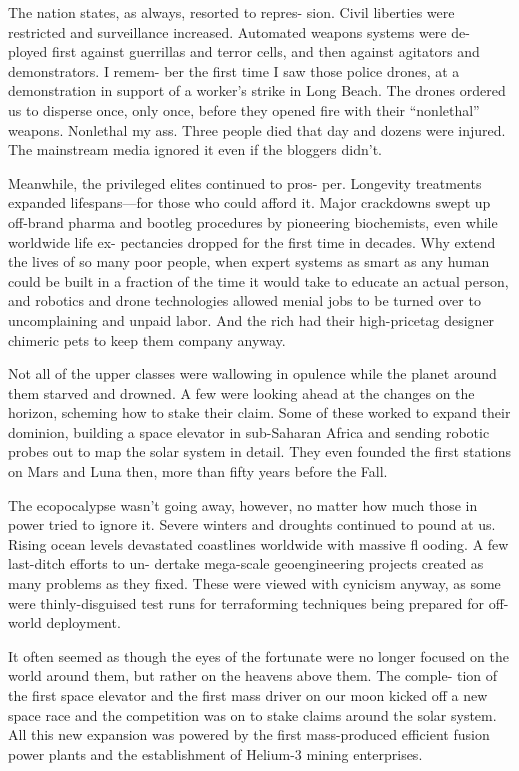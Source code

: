 The nation states, as always, resorted to repres-
sion. Civil liberties were restricted and surveillance 
increased. Automated weapons systems were de-
ployed first against guerrillas and terror cells, and 
then against agitators and demonstrators. I remem-
ber the first time I saw those police drones, at a 
demonstration in support of a worker's strike in Long 
Beach. The drones ordered us to disperse once, only 
once, before they opened fire with their ``nonlethal'' 
weapons. Nonlethal my ass. Three people died that 
day and dozens were injured. The mainstream media 
ignored it even if the bloggers didn't.

Meanwhile, the privileged elites continued to pros-
per. Longevity treatments expanded lifespans—for 
those who could afford it. Major crackdowns swept 
up off-brand pharma and bootleg procedures by 
pioneering biochemists, even while worldwide life ex-
pectancies dropped for the first time in decades. Why 
extend the lives of so many poor people, when expert 
systems as smart as any human could be built in a 
fraction of the time it would take to educate an actual 
person, and robotics and drone technologies allowed 
menial jobs to be turned over to uncomplaining and 
unpaid labor. And the rich had their high-pricetag 
designer chimeric pets to keep them company anyway.

Not all of the upper classes were wallowing in 
opulence while the planet around them starved and 
drowned. A few were looking ahead at the changes on 
the horizon, scheming how to stake their claim. Some 
of these worked to expand their dominion, building 
a space elevator in sub-Saharan Africa and sending 
robotic probes out to map the solar system in detail. 
They even founded the first stations on Mars and 
Luna then, more than fifty years before the Fall.

The ecopocalypse wasn't going away, however, no 
matter how much those in power tried to ignore it. 
Severe winters and droughts continued to pound at us. 
Rising ocean levels devastated coastlines worldwide 
with massive fl ooding. A few last-ditch efforts to un-
dertake mega-scale geoengineering projects created as 
many problems as they fixed. These were viewed with 
cynicism anyway, as some were thinly-disguised test 
runs for terraforming techniques being prepared for 
off-world deployment.

It often seemed as though the eyes of the fortunate 
were no longer focused on the world around them, 
but rather on the heavens above them. The comple-
tion of the first space elevator and the first mass driver 
on our moon kicked off a new space race and the 
competition was on to stake claims around the solar 
system. All this new expansion was powered by the 
first mass-produced efficient fusion power plants and 
the establishment of Helium-3 mining enterprises.

